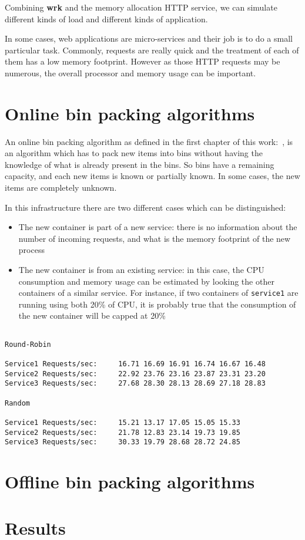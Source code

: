 Combining \textbf{wrk} and the memory allocation HTTP service, we can simulate
different kinds of load and different kinds of application. 

In some cases, web applications are micro-services and their job is to do a small
particular task. Commonly, requests are really quick and the treatment of each of
them has a low memory footprint. However as those HTTP requests may be numerous,
the overall processor and memory usage can be important.

 

\section{Online bin packing algorithms}

An online bin packing algorithm as defined in the first chapter of this
work:~, is an algorithm which has to pack new items into
bins without having the knowledge of what is already present in the bins. So
bins have a remaining capacity, and each new items is known or partially known.
In some cases, the new items are completely unknown.

In this infrastructure there are two different cases which can be distinguished:

\begin{itemize}
\item{The new container is part of a new service: there is no information about
the number of incoming requests, and what is the memory footprint of the new process}
\item{The new container is from an existing service: in this case, the CPU consumption
and memory usage can be estimated by looking the other containers of a similar service.
For instance, if two containers of \texttt{service1} are running using both 20\% of CPU,
it is probably true that the consumption of the new container will be capped at 20\%}
\end{itemize}


\begin{verbatim}

Round-Robin

Service1 Requests/sec:     16.71 16.69 16.91 16.74 16.67 16.48
Service2 Requests/sec:     22.92 23.76 23.16 23.87 23.31 23.20
Service3 Requests/sec:     27.68 28.30 28.13 28.69 27.18 28.83

Random

Service1 Requests/sec:     15.21 13.17 17.05 15.05 15.33
Service2 Requests/sec:     21.78 12.83 23.14 19.73 19.85
Service3 Requests/sec:     30.33 19.79 28.68 28.72 24.85

\end{verbatim}


\section{Offline bin packing algorithms}
\section{Results}


